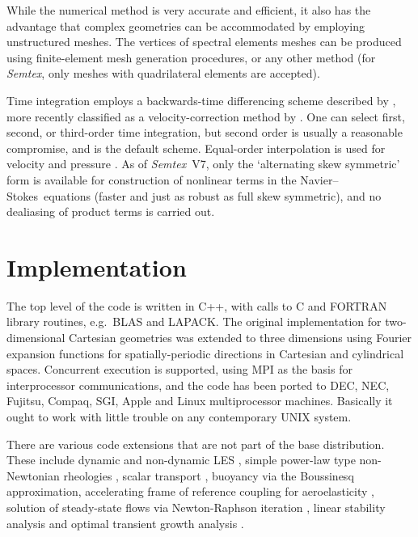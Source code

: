 \documentclass[11pt,a4paper]{report}
\newcommand{\Semtex}{\emph{Semtex}}
\newcommand\NavSto{Navier--Stokes}
\begin{document}
While the numerical method is very accurate and efficient, it also has
the advantage that complex geometries can be accommodated by employing
unstructured meshes.  The vertices of spectral elements meshes can be
produced using finite-element mesh generation procedures, or any other
method (for \Semtex, only meshes with quadrilateral elements are
accepted).

Time integration employs a backwards-time differencing scheme
described by \citet{kio91}, more recently classified as a
velocity-correction method by \citet{gush03}. One can select first,
second, or third-order time integration, but second order is usually a
reasonable compromise, and is the default scheme. Equal-order
interpolation is used for velocity and pressure
\citep[see][]{gms06}. As of \Semtex\ V7, only the `alternating skew
symmetric' form \citep{zan91b} is available for construction of
nonlinear terms in the \NavSto\ equations (faster and just as robust
as full skew symmetric), and no dealiasing of product terms is carried
out.

\section{Implementation}

The top level of the code is written in C++, with calls to C and
FORTRAN library routines, e.g.\ BLAS and LAPACK. The original
implementation for two-dimensional Cartesian geometries was extended
to three dimensions using Fourier expansion functions for
spatially-periodic directions in Cartesian and cylindrical spaces.
Concurrent execution is supported, using MPI as the basis for
interprocessor communications, and the code has been ported to DEC,
NEC, Fujitsu, Compaq, SGI, Apple and Linux multiprocessor
machines. Basically it ought to work with little trouble on any
contemporary UNIX system.

There are various code extensions that are not part of the base
distribution. These include dynamic and non-dynamic LES
\citep{blsc03}, simple power-law type non-Newtonian rheologies
\citep{rb06}, scalar transport \citep{hmb01a,hmb02b}, buoyancy via the
Boussinesq approximation, accelerating frame of reference coupling for
aeroelasticity \citep{bh96a,bh99,bgw01,hmb03}, solution of
steady-state flows via Newton-Raphson iteration \citep{hmb02a}, linear
stability analysis
\citep{hmb02a,bllo03b,bllo03a,bml04,shbl04,ebs06,blsh07} and optimal
transient growth analysis \citet{bbs08a}.
\end{document}
